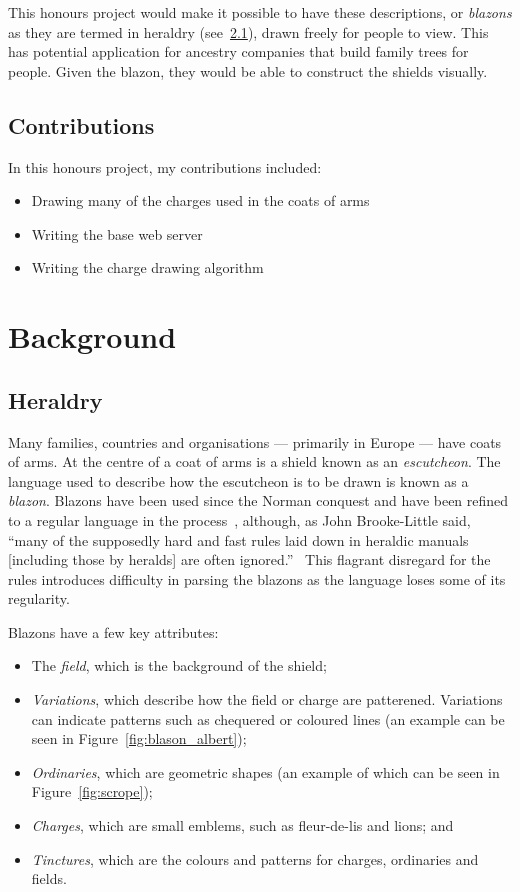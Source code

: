 \documentclass[nobib, a4paper, twoside, justified]{tufte-book}
\begin{document}
This honours project would make it possible to have these descriptions, or \textit{blazons} as they
are termed in heraldry (see~\ref{sec:heraldry}), drawn freely for people to view. This has
potential application for ancestry companies that build family trees for people. Given the blazon,
they would be able to construct the shields visually.

\section{Contributions}\label{sec:contributions}

In this honours project, my contributions included:

\begin{itemize}
  \item Drawing many of the charges used in the coats of arms
  \item Writing the base web server
  \item Writing the charge drawing algorithm
\end{itemize}

\chapter{Background}\label{cha:background}

\section{Heraldry}\label{sec:heraldry}

Many families, countries and organisations --- primarily in Europe --- have coats of arms. At the
centre of a coat of arms is a shield known as an \textit{escutcheon}. The language used to describe
how the escutcheon is to be drawn is known as a \textit{blazon}. Blazons have been used since the
Norman conquest and have been refined to a regular language in the process~\autocite{boutell_1864},
although, as John Brooke-Little said, ``many of the supposedly hard and fast rules laid down in
heraldic manuals [including those by heralds] are often ignored.''~\autocite{brooke_little_1985}
This flagrant disregard for the rules introduces difficulty in parsing the blazons as the language
loses some of its regularity.

Blazons have a few key attributes:
\begin{itemize}
  \item The \textit{field}, which is the background of the shield;
  \item \textit{Variations}, which describe how the field or charge are patterened. Variations can
    indicate patterns such as chequered or coloured lines (an example can be seen in
    Figure~\ref{fig:blason_albert});
  \item \textit{Ordinaries}, which are geometric shapes (an example of which can be seen in
    Figure~\ref{fig:scrope});
  \item \textit{Charges}, which are small emblems, such as fleur-de-lis and lions; and
  \item \textit{Tinctures}, which are the colours and patterns for charges, ordinaries and fields.
\end{itemize}
\end{document}
